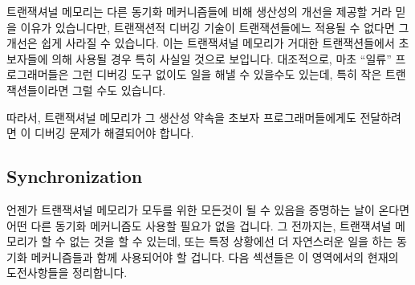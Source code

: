 트랜잭셔널 메모리는 다른 동기화 메커니즘들에 비해 생산성의 개선을 제공할 거라
믿을 이유가 있습니다만, 트랜잭션적 디버깅 기술이 트랜잭션들에느 적용될 수
없다면 그 개선은 쉽게 사라질 수 있습니다.
이는 트랜잭셔널 메모리가 거대한 트랜잭션들에서 초보자들에 의해 사용될 경우 특히
사실일 것으로 보입니다.
대조적으로, 마초 ``일류'' 프로그래머들은 그런 디버깅 도구 없이도 일을 해낼 수
있을수도 있는데, 특히 작은 트랜잭션들이라면 그럴 수도 있습니다.

따라서, 트랜잭셔널 메모리가 그 생산성 약속을 초보자 프로그래머들에게도
전달하려면 이 디버깅 문제가 해결되어야 합니다.

\subsection{Synchronization}
\label{sec:future:Synchronization}

언젠가 트랜잭셔널 메모리가 모두를 위한 모든것이 될 수 있음을 증명하는 날이
온다면 어떤 다른 동기화 메커니즘도 사용할 필요가 없을 겁니다.
그 전까지는, 트랜잭셔널 메모리가 할 수 없는 것을 할 수 있는데, 또는 특정
상황에선 더 자연스러운 일을 하는 동기화 메커니즘들과 함께 사용되어야 할 겁니다.
다음 섹션들은 이 영역에서의 현재의 도전사항들을 정리합니다.


